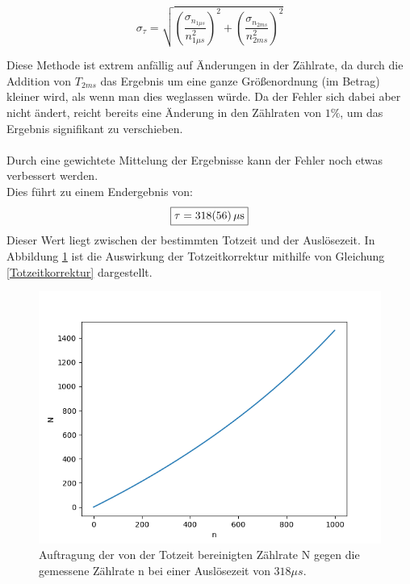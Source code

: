\documentclass[12pt,a4paper]{article}
\begin{document}
\begin{equation}
\sigma_{\tau} = \sqrt{\left(\dfrac{\sigma_{n_{1\mu s}}}{n_{1\mu s}^{2}}\right)^2 + \left(\dfrac{\sigma_{n_{2ms}}}{n_{2ms}^{2}}\right)^2}
\end{equation}

Diese Methode ist extrem anfällig auf Änderungen in der Zählrate, da durch die Addition von $T_{2ms}$ das Ergebnis um eine ganze Größenordnung (im Betrag) kleiner wird, als wenn man dies weglassen würde. Da der Fehler sich dabei aber nicht ändert, reicht bereits eine Änderung in den Zählraten von $1\%$, um das Ergebnis signifikant zu verschieben.\\
\\
Durch eine gewichtete Mittelung der Ergebnisse kann der Fehler noch etwas verbessert werden.\\
Dies führt zu einem Endergebnis von:
\begin{equation}
\boxed{\tau = \SI{318\pm 56}{\mu s}}
\end{equation}
Dieser Wert liegt zwischen der bestimmten Totzeit und der Auslösezeit.
In Abbildung \ref{fig:Totzeit} ist die Auswirkung der Totzeitkorrektur mithilfe von Gleichung \ref{Totzeitkorrektur} dargestellt.

\begin{figure}
\centering
\includegraphics[scale=0.9]{Bilder/Totzeitkorrektur.png}
\caption{Auftragung der von der Totzeit bereinigten Zählrate N gegen die gemessene Zählrate n bei einer Auslösezeit von $318\mu s$.}
\label{fig:Totzeit}
\end{figure}
\end{document}
